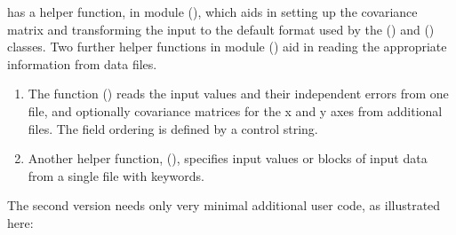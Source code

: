 \documentclass[a4paper,10pt,english]{sphinxmanual}
\begin{document}
 has a helper function,  in module {\hyperref[index:module-fit]{\emph{}}} (),
which aids in setting up the covariance matrix and transforming
the input to the default format used by the {\hyperref[index:kafe.dataset.Dataset]{\emph{}}} () and {\hyperref[index:kafe.fit.Fit]{\emph{}}} ()
classes. Two further helper functions in module {\hyperref[index:module-file_tools]{\emph{}}} ()
aid in reading the appropriate information from data files.
\begin{enumerate}
\item {} 
The function  {\hyperref[index:kafe.file_tools.parse_column_data]{\emph{}}} () reads the input values and their
independent errors from one file, and optionally covariance
matrices for the x and y axes from additional files. The field ordering
is defined by a control string.

\item {} 
Another helper function, {\hyperref[index:kafe.file_tools.buildDataset_fromFile]{\emph{}}} (), specifies
input values or blocks of input data from a single file with
keywords.

\end{enumerate}

The second version needs only very minimal additional user
code, as illustrated here:
\end{document}
